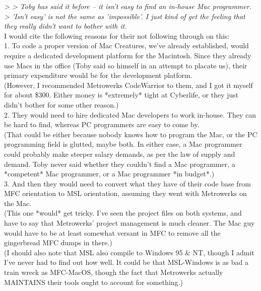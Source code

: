 \documentclass[11pt,twoside,a4paper]{article}
\begin{document}
\begin{multicols*}{2}
\emph{> > Toby has said it before -- it isn't easy to find an in-house Mac programmer.}~\\
\emph{> 'Isn't easy' is not the same as 'impossible'. I just kind of get the feeling that they really didn't want to bother with it.}~\\

I would cite the following reasons for their not following through on this:~\\

1. To code a proper version of Mac Creatures, we've already established, would require a dedicated development platform for the Macintosh. Since they already use Macs in the office (Toby said so himself in an attempt to placate us), their primary expenditure would be for the development platform.~\\

(However, I recommended Metrowerks CodeWarrior to them, and I got it myself for about \$300. Either money is *extremely* tight at Cyberlife, or they just didn't bother for some other reason.)~\\

2. They would need to hire dedicated Mac developers to work in-house. They can be hard to find, whereas PC programmers are easy to come by.~\\

(That could be either because nobody knows how to program the Mac, or the PC programming field is glutted, maybe both. In either case, a Mac programmer could probably make steeper salary demands, as per the law of supply and demand. Toby never said whether they couldn't find a Mac programmer, a *competent* Mac programmer, or a Mac programmer *in budget*.)~\\

3. And then they would need to convert what they have of their code base from MFC orientation to MSL orientation, assuming they went with Metrowerks on the Mac.~\\

(This one *would* get tricky. I've seen the project files on both systems, and have to say that Metrowerks' project management is much cleaner. The Mac guy would have to be at least somewhat versant in MFC to remove all the gingerbread MFC dumps in there.)~\\

(I should also note that MSL also compile to Windows 95 \& NT, though I admit I've never had to find out how well. It could be that MSL-Windows is as bad a train wreck as MFC-MacOS, though the fact that Metrowerks actually MAINTAINS their tools ought to account for something.)~\\


\end{multicols*}
\end{document}
